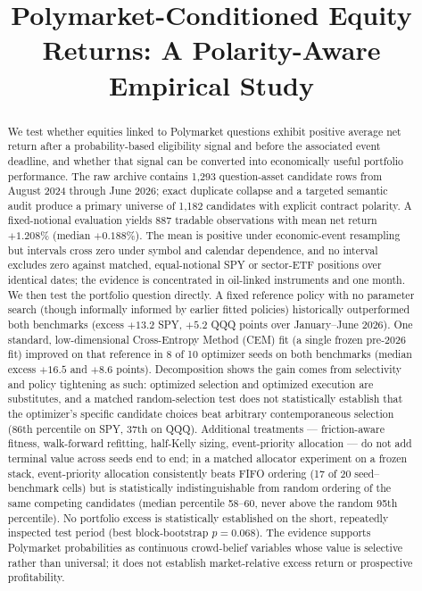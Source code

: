\documentclass[sigconf,anonymous]{acmart}
\begin{document}
\title{Polymarket-Conditioned Equity Returns: A Polarity-Aware Empirical Study}

\begin{abstract}
We test whether equities linked to Polymarket questions exhibit positive average net return after a probability-based eligibility signal and before the associated event deadline, and whether that signal can be converted into economically useful portfolio performance. The raw archive contains 1,293 question-asset candidate rows from August 2024 through June 2026; exact duplicate collapse and a targeted semantic audit produce a primary universe of 1,182 candidates with explicit contract polarity. A fixed-notional evaluation yields 887 tradable observations with mean net return $+1.208\%$ (median $+0.188\%$). The mean is positive under economic-event resampling but intervals cross zero under symbol and calendar dependence, and no interval excludes zero against matched, equal-notional SPY or sector-ETF positions over identical dates; the evidence is concentrated in oil-linked instruments and one month. We then test the portfolio question directly. A fixed reference policy with no parameter search (though informally informed by earlier fitted policies) historically outperformed both benchmarks (excess $+13.2$ SPY, $+5.2$ QQQ points over January--June 2026). One standard, low-dimensional Cross-Entropy Method (CEM) fit (a single frozen pre-2026 fit) improved on that reference in 8 of 10 optimizer seeds on both benchmarks (median excess $+16.5$ and $+8.6$ points). Decomposition shows the gain comes from selectivity and policy tightening as such: optimized selection and optimized execution are substitutes, and a matched random-selection test does not statistically establish that the optimizer's specific candidate choices beat arbitrary contemporaneous selection (86th percentile on SPY, 37th on QQQ). Additional treatments --- friction-aware fitness, walk-forward refitting, half-Kelly sizing, event-priority allocation --- do not add terminal value across seeds end to end; in a matched allocator experiment on a frozen stack, event-priority allocation consistently beats FIFO ordering (17 of 20 seed--benchmark cells) but is statistically indistinguishable from random ordering of the same competing candidates (median percentile 58--60, never above the random 95th percentile). No portfolio excess is statistically established on the short, repeatedly inspected test period (best block-bootstrap $p=0.068$). The evidence supports Polymarket probabilities as continuous crowd-belief variables whose value is selective rather than universal; it does not establish market-relative excess return or prospective profitability.
\end{abstract}
\end{document}
